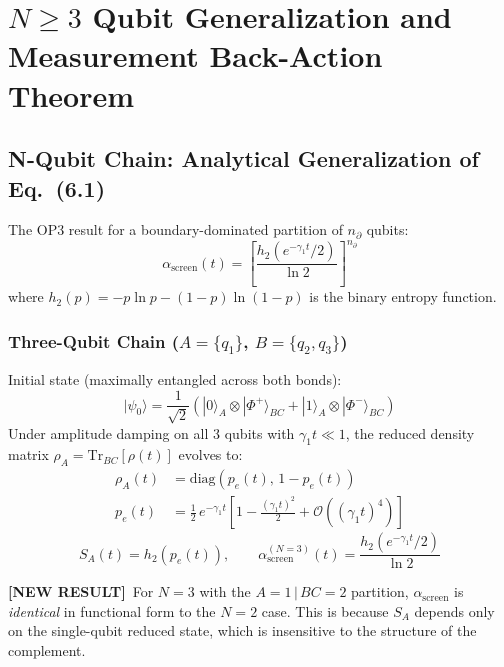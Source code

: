 \documentclass[11pt,letterpaper]{article}
\newcommand{\NEW}{\textcolor{newresult}{\textbf{[NEW RESULT]}}}
\newcommand{\SA}{S_A}
\newcommand{\asc}{\alpha_{\mathrm{screen}}}
\newcommand{\htwo}{h_2}
\newcommand{\nprt}{n_{\partial}}
\newcommand{\gamone}{\gamma_1}
\begin{document}
\newpage
\section{$N \geq 3$ Qubit Generalization and Measurement Back-Action Theorem}

\subsection{N-Qubit Chain: Analytical Generalization of Eq.\ (6.1)}

The OP3 result for a boundary-dominated partition of $\nprt$ qubits:
\begin{equation}
  \asc(t) = \left[\frac{\htwo\!\left(e^{-\gamone t}/2\right)}{\ln 2}\right]^{\nprt}
  \label{eq:alpha_general}
\end{equation}
where $\htwo(p) = -p\ln p - (1-p)\ln(1-p)$ is the binary entropy function.

\subsubsection{Three-Qubit Chain ($A = \{q_1\}$, $B = \{q_2, q_3\}$)}

Initial state (maximally entangled across both bonds):
\begin{equation}
  |\psi_0\rangle = \frac{1}{\sqrt{2}}\left(|0\rangle_A \otimes |\Phi^+\rangle_{BC} + |1\rangle_A \otimes |\Phi^-\rangle_{BC}\right)
\end{equation}
Under amplitude damping on all 3 qubits with $\gamone t \ll 1$, the reduced density matrix $\rho_A = \mathrm{Tr}_{BC}[\rho(t)]$ evolves to:
\begin{align}
  \rho_A(t) &= \mathrm{diag}\!\left(p_e(t),\, 1-p_e(t)\right) \\
  p_e(t)    &= \tfrac{1}{2}\,e^{-\gamone t}\left[1 - \tfrac{(\gamone t)^2}{2} + \mathcal{O}\!\left((\gamone t)^4\right)\right]
\end{align}
\begin{equation}
  \SA(t) = \htwo\!\left(p_e(t)\right), \qquad
  \asc^{(N=3)}(t) = \frac{\htwo(e^{-\gamone t}/2)}{\ln 2}
\end{equation}

\NEW\ For $N=3$ with the $A=1\,|\,BC=2$ partition, $\asc$ is \emph{identical} in functional form to the $N=2$ case. This is because $\SA$ depends only on the single-qubit reduced state, which is insensitive to the structure of the complement.
\end{document}

